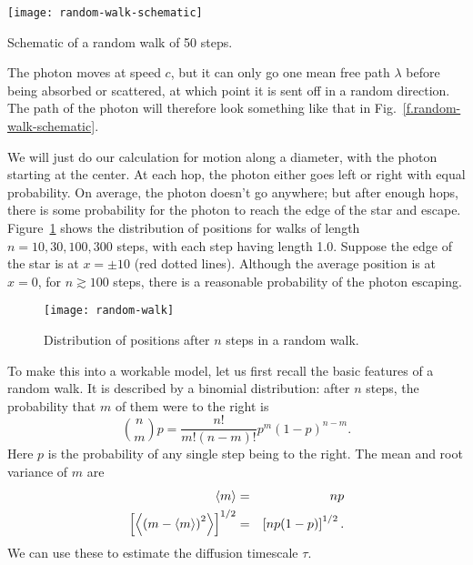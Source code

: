 \begin{marginfigure}
\texttt{[image: random-walk-schematic]}
\caption{\label{f.random-walk-schematic}Schematic of a random walk of 50 steps.}
\end{marginfigure}
The photon moves at speed $c$, but it can only go one mean free path $\lambda$ before being absorbed or scattered, at which point it is sent off in a random direction. The path of the photon will therefore look something like that in Fig.~\ref{f.random-walk-schematic}.

We will just do our calculation for motion along a diameter, with the photon starting at the center. At each hop, the photon either goes left or right with equal probability. On average, the photon doesn't go anywhere; but after enough hops, there is some probability for the photon to reach the edge of the star and escape. Figure~\ref{f.random-walk} shows the distribution of positions for walks of length $n = 10, 30, 100, 300$ steps, with each step having length 1.0. Suppose the edge of the star is at $x=\pm 10$ (red dotted lines).  Although the average position is at $x=0$, for $n \gtrsim 100$ steps, there is a reasonable probability of the photon escaping.
\begin{figure}[htbp]
\forceversofloat
\texttt{[image: random-walk]}
\caption{\label{f.random-walk} Distribution of positions after $n$ steps in a random walk.}
\end{figure}

To make this into a workable model, let us first recall the basic features of a random walk. It is described by a binomial distribution: after $n$ steps, the probability that $m$ of them were to the right is
\begin{equation}\label{e.binomial}
    \binom{n}{m}{p} = \frac{n!}{m!(n-m)!} p^{m}(1-p)^{n-m}.
\end{equation}
Here $p$ is the probability of any single step being to the right.
The mean and root variance of $m$ are
\begin{eqnarray}
	\left\langle m\right\rangle &=& np \label{e.mean-binomial} \\
	\left[\left\langle\left(m-\left\langle m\right\rangle\right)^{2}\right\rangle\right]^{1/2} &=& \left[np(1-p)\right]^{1/2}. \label{e.var-binomial}
\end{eqnarray}
We can use these to estimate the diffusion timescale $\tau$.

